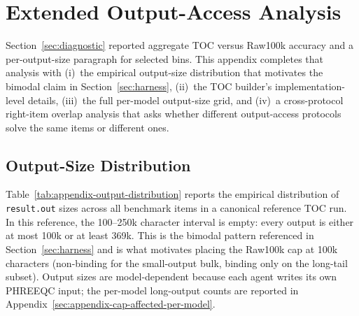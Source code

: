 \documentclass{article}
\begin{document}
\section{Extended Output-Access Analysis}
\label{sec:appendix-output-access}

Section~\ref{sec:diagnostic} reported aggregate TOC versus Raw100k accuracy and a per-output-size paragraph for selected bins. This appendix completes that analysis with (i)~the empirical output-size distribution that motivates the bimodal claim in Section~\ref{sec:harness}, (ii)~the TOC builder's implementation-level details, (iii)~the full per-model output-size grid, and (iv)~a cross-protocol right-item overlap analysis that asks whether different output-access protocols solve the same items or different ones.

\subsection{Output-Size Distribution}
\label{sec:appendix-output-distribution}

Table~\ref{tab:appendix-output-distribution} reports the empirical distribution of \texttt{result.out} sizes across all \BenchN{} benchmark items in a canonical reference TOC run. In this reference, the 100--250k character interval is empty: every output is either at most 100k or at least 369k. This is the bimodal pattern referenced in Section~\ref{sec:harness} and is what motivates placing the Raw100k cap at 100k characters (non-binding for the small-output bulk, binding only on the long-tail subset). Output sizes are model-dependent because each agent writes its own PHREEQC input; the per-model long-output counts are reported in Appendix~\ref{sec:appendix-cap-affected-per-model}.
\end{document}
